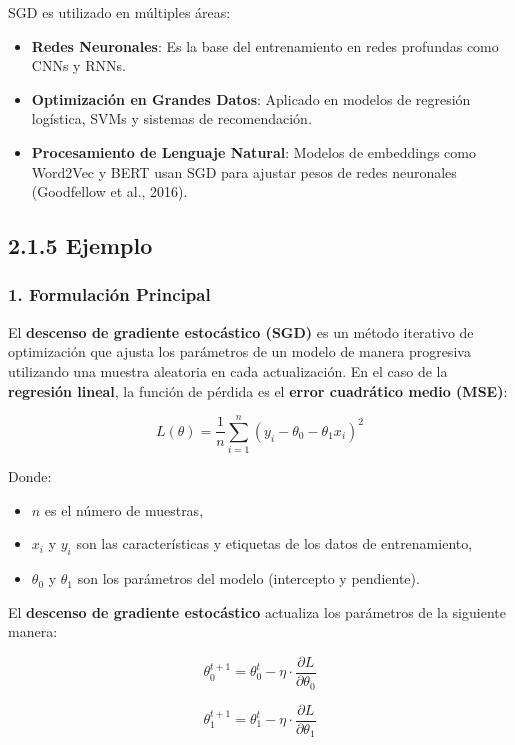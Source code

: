 \documentclass{article}
\begin{document}
     SGD es utilizado en m\'ultiples \'areas:
     
     \begin{itemize}
     	\item \textbf{Redes Neuronales}: Es la base del entrenamiento en redes profundas como CNNs y RNNs.
     	\item \textbf{Optimizaci\'on en Grandes Datos}: Aplicado en modelos de regresi\'on log\'istica, SVMs y sistemas de recomendaci\'on.
     	\item \textbf{Procesamiento de Lenguaje Natural}: Modelos de embeddings como Word2Vec y BERT usan SGD para ajustar pesos de redes neuronales (Goodfellow et al., 2016).
     \end{itemize}
	
	
	\subsection*{2.1.5 Ejemplo}
	
\subsubsection*{1. Formulación Principal}

El \textbf{descenso de gradiente estocástico (SGD)} es un método iterativo de optimización que ajusta los parámetros de un modelo de manera progresiva utilizando una muestra aleatoria en cada actualización. En el caso de la \textbf{regresión lineal}, la función de pérdida es el \textbf{error cuadrático medio (MSE)}:

\[
L(\theta) = \frac{1}{n} \sum_{i=1}^{n} (y_i - \theta_0 - \theta_1 x_i)^2
\]

Donde:  
\begin{itemize}
	\item \( n \) es el número de muestras,  
	\item \( x_i \) y \( y_i \) son las características y etiquetas de los datos de entrenamiento,  
	\item \( \theta_0 \) y \( \theta_1 \) son los parámetros del modelo (intercepto y pendiente).  
\end{itemize}

El \textbf{descenso de gradiente estocástico} actualiza los parámetros de la siguiente manera:

\[
\theta_0^{t+1} = \theta_0^t - \eta \cdot \frac{\partial L}{\partial \theta_0}
\]

\[
\theta_1^{t+1} = \theta_1^t - \eta \cdot \frac{\partial L}{\partial \theta_1}
\]
\end{document}

